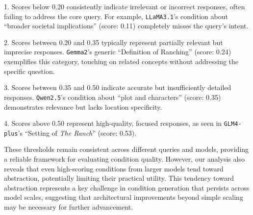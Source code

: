 1. Scores below 0.20 consistently indicate irrelevant or incorrect responses, often failing to address the core query. For example, \texttt{LLaMA3.1}'s condition about ``broader societal implications'' (score: 0.11) completely misses the query's intent.

2. Scores between 0.20 and 0.35 typically represent partially relevant but imprecise responses. \texttt{Gemma2}'s generic ``Definition of Ranching'' (score: 0.24) exemplifies this category, touching on related concepts without addressing the specific question.

3. Scores between 0.35 and 0.50 indicate accurate but insufficiently detailed responses. \texttt{Qwen2.5}'s condition about ``plot and characters'' (score: 0.35) demonstrates relevance but lacks location specificity.

4. Scores above 0.50 represent high-quality, focused responses, as seen in \texttt{GLM4-plus}'s ``Setting of \textit{The Ranch}'' (score: 0.53).

These thresholds remain consistent across different queries and models, providing a reliable framework for evaluating condition quality. However, our analysis also reveals that even high-scoring conditions from larger models tend toward abstraction, potentially limiting their practical utility. This tendency toward abstraction represents a key challenge in condition generation that persists across model scales, suggesting that architectural improvements beyond simple scaling may be necessary for further advancement.



